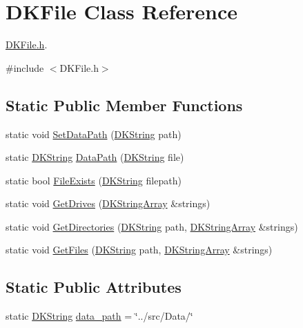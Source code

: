 \hypertarget{class_d_k_file}{\section{D\-K\-File Class Reference}
\label{class_d_k_file}
}


\hyperlink{_d_k_file_8h}{D\-K\-File.\-h}.  




{\ttfamily \#include $<$D\-K\-File.\-h$>$}

\subsection*{Static Public Member Functions}
\begin{DoxyCompactItemize}
\item 
static void \hyperlink{class_d_k_file_ad0d2c4ebb38d5a6442b2cbf14def9ee2}{Set\-Data\-Path} (\hyperlink{_d_k_string_8h_ac168e8555ceba18e1a2919b21976bc84}{D\-K\-String} path)
\item 
static \hyperlink{_d_k_string_8h_ac168e8555ceba18e1a2919b21976bc84}{D\-K\-String} \hyperlink{class_d_k_file_a405a714aeec1d69982089c422c18bc93}{Data\-Path} (\hyperlink{_d_k_string_8h_ac168e8555ceba18e1a2919b21976bc84}{D\-K\-String} file)
\item 
static bool \hyperlink{class_d_k_file_a46fa09a622bfb600e92649168dd20c4f}{File\-Exists} (\hyperlink{_d_k_string_8h_ac168e8555ceba18e1a2919b21976bc84}{D\-K\-String} filepath)
\item 
static void \hyperlink{class_d_k_file_a674736d0ef12de5a9c7044b1e8b5a157}{Get\-Drives} (\hyperlink{_d_k_string_8h_a7eaad67bd9c10af6a5df95c3d7dd44f8}{D\-K\-String\-Array} \&strings)
\item 
static void \hyperlink{class_d_k_file_a909b192852626cd051945da1e7fbaa40}{Get\-Directories} (\hyperlink{_d_k_string_8h_ac168e8555ceba18e1a2919b21976bc84}{D\-K\-String} path, \hyperlink{_d_k_string_8h_a7eaad67bd9c10af6a5df95c3d7dd44f8}{D\-K\-String\-Array} \&strings)
\item 
static void \hyperlink{class_d_k_file_a2ab833192026e1ef05a2ecfd52cb2875}{Get\-Files} (\hyperlink{_d_k_string_8h_ac168e8555ceba18e1a2919b21976bc84}{D\-K\-String} path, \hyperlink{_d_k_string_8h_a7eaad67bd9c10af6a5df95c3d7dd44f8}{D\-K\-String\-Array} \&strings)
\end{DoxyCompactItemize}
\subsection*{Static Public Attributes}
\begin{DoxyCompactItemize}
\item 
static \hyperlink{_d_k_string_8h_ac168e8555ceba18e1a2919b21976bc84}{D\-K\-String} \hyperlink{class_d_k_file_af92f06a1fec50f4d1e435525c079684a}{data\-\_\-path} = \char`\"{}../src/Data/\char`\"{}
\end{DoxyCompactItemize}


